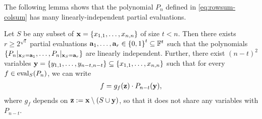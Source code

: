 \documentclass[11pt]{article}
\begin{document}
The following lemma shows that the polynomial $P_n$ defined in \eqref{eq:rowsum-colsum} has many linearly-independent partial evaluations. 

\begin{lemma}\label{lem:evalDim-rowsum-colsum}
  Let $S$ be any subset of $\mathbf{x}=\left\{ x_{1,1}, \ldots, x_{n,n} \right\}$ of size $t < n$.
Then there exists $r \geq 2^{\sqrt{t}}$ partial evaluations $\veca_1, \ldots, \veca_r \in \set{0,1}^t \subseteq \F^t$ such that the polynomials $\left\{ P_n|_{\mathbf{x}_S = \mathbf{a}_1}, \ldots, P_n|_{\mathbf{x}_S = \mathbf{a}_r} \right\}$ are linearly independent. Further, there exist $(n-t)^2$ variables
$\mathbf{y}=\left\{ y_{1,1}, \ldots, y_{n-t,n-t} \right\} \subseteq \left\{ x_{1,1}, \ldots, x_{n,n} \right\}$ such that for every $f \in \operatorname{eval}_S(P_n)$, we can write
\begin{align}
\label{eq:projection}
f = g_f (\mathbf{z}) \cdot P_{n-t} (\mathbf{y}),
\end{align}
where $g_f$ depends on $\mathbf{z} := \mathbf{x} \setminus (S \cup \mathbf{y})$, so that it does not share any variables with $P_{n-t}$.
\end{lemma}
\end{document}
